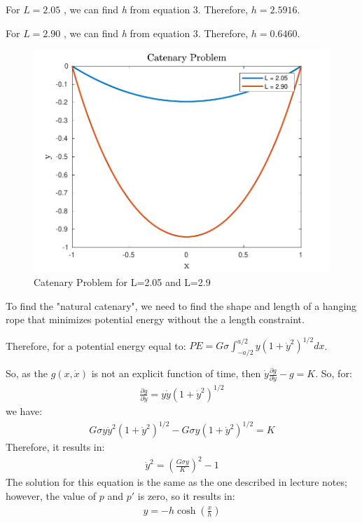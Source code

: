 \documentclass{article}
\begin{document}
For $L=2.05$ , we can find \textit{h} from equation 3. Therefore, $h=2.5916$.

For $L=2.90$ , we can find \textit{h} from equation 3. Therefore, $h=0.6460$.

\begin{figure}[H]
\centering
\includegraphics [width=4.4in]{f1}
\caption{Catenary Problem for L=2.05 and L=2.9}
\end{figure}

To find the "natural catenary", we need to find the shape and length of a hanging rope that minimizes potential energy without the a length constraint. 

Therefore, for a potential energy equal to: $PE = G\sigma\int_{-a/2}^{a/2} y\left( 1+\dot{y}^2 \right)^{1/2}dx$. 

So, as the $g(x,\dot{x})$ is not an explicit function of time, then $\dot{y}\frac{\partial g}{\partial \dot{y}} -g=K$.
So, for:
\begin{eqnarray*}
\frac{\partial g}{\partial \dot{y}} = y\dot{y}(1+\dot{y}^2)^{1/2}
\end{eqnarray*}
we have:
\begin{eqnarray*}
G\sigma y\dot{y}^2(1+\dot{y}^2)^{1/2}-G\sigma y\left( 1+\dot{y}^2 \right)^{1/2} = K
\end{eqnarray*}
Therefore, it results in:
\begin{eqnarray*}
\dot{y}^2 = \left(\frac{G\sigma y}{K}\right)^2 - 1
\end{eqnarray*}
The solution for this equation is the same as the one described in lecture notes; however, the value of $p$ and $p'$ is zero, so it results in:
\begin{eqnarray}
y = -h\cosh(\frac{x}{h})
\end{eqnarray}
\end{document}
